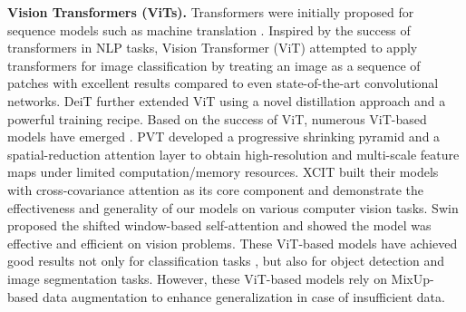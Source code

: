 \documentclass{article} \usepackage{iclr2023_conference,times}
\begin{document}
\textbf{Vision Transformers (ViTs).}
Transformers were initially proposed for sequence models such as machine translation \citep{vaswani2017attention}. Inspired by the success of transformers in NLP tasks,  Vision Transformer (ViT) \citep{2020ViTs} attempted to apply transformers for image classification by treating an image as a sequence of patches with excellent results compared to even state-of-the-art convolutional networks. DeiT \citep{deit} further extended ViT using a novel distillation approach and a powerful training recipe. Based on the success of ViT, numerous ViT-based models have emerged \citep{TokentoToken, pyramidViTs, swin, cait, ali2021xcit, yang2021focal}. PVT \citep{pyramidViTs} developed a progressive shrinking pyramid and a spatial-reduction attention layer to obtain high-resolution and multi-scale feature maps under limited computation/memory resources. XCIT \citep{ali2021xcit} built their models with cross-covariance attention as its core component and demonstrate the effectiveness and generality of our models on various computer vision tasks. Swin \citep{swin} proposed the shifted window-based self-attention and showed the model was effective and efficient on vision problems. These ViT-based models have achieved good results not only for classification tasks \citep{deng2009imagenet}, but also for object detection \citep{fang2021youYOLOS, dai2021dynamicdetr, detr, zhu2020deformabledetr} and image segmentation \citep{strudel2021segmenter, pyramidViTs, swin} tasks. However, these ViT-based models rely on MixUp-based data augmentation to enhance generalization in case of insufficient data.
\end{document}
